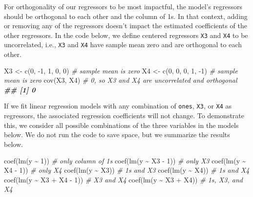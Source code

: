 \documentclass[
]{book}
\newenvironment{Shaded}{\begin{snugshade}}{\end{snugshade}}
\newcommand{\CommentTok}[1]{\textcolor[rgb]{0.56,0.35,0.01}{\textit{#1}}}
\newcommand{\DecValTok}[1]{\textcolor[rgb]{0.00,0.00,0.81}{#1}}
\newcommand{\DocumentationTok}[1]{\textcolor[rgb]{0.56,0.35,0.01}{\textbf{\textit{#1}}}}
\newcommand{\FunctionTok}[1]{\textcolor[rgb]{0.00,0.00,0.00}{#1}}
\newcommand{\NormalTok}[1]{#1}
\newcommand{\OtherTok}[1]{\textcolor[rgb]{0.56,0.35,0.01}{#1}}
\newcommand{\SpecialCharTok}[1]{\textcolor[rgb]{0.00,0.00,0.00}{#1}}
\theoremstyle{definition}
\theoremstyle{definition}
\theoremstyle{definition}
\theoremstyle{definition}
\theoremstyle{remark}
\begin{document}
For orthogonality of our regressors to be most impactful, the model's
regressors should be orthogonal to each other and the column of 1s. In
that context, adding or removing any of the regressors doesn't impact
the estimated coefficients of the other regressors. In the code below,
we define centered regressors \texttt{X3} and \texttt{X4} to be uncorrelated, i.e.,
\texttt{X3} and \texttt{X4} have sample mean zero and are orthogonal to each other.

\begin{Shaded}
\begin{Highlighting}[]
\NormalTok{X3 }\OtherTok{\textless{}{-}}  \FunctionTok{c}\NormalTok{(}\DecValTok{0}\NormalTok{, }\SpecialCharTok{{-}}\DecValTok{1}\NormalTok{, }\DecValTok{1}\NormalTok{, }\DecValTok{0}\NormalTok{, }\DecValTok{0}\NormalTok{) }\CommentTok{\# sample mean is zero}
\NormalTok{X4 }\OtherTok{\textless{}{-}} \FunctionTok{c}\NormalTok{(}\DecValTok{0}\NormalTok{, }\DecValTok{0}\NormalTok{, }\DecValTok{0}\NormalTok{, }\DecValTok{1}\NormalTok{, }\SpecialCharTok{{-}}\DecValTok{1}\NormalTok{)  }\CommentTok{\# sample mean is zero}
\FunctionTok{cov}\NormalTok{(X3, X4)              }\CommentTok{\# 0, so X3 and X4 are uncorrelated and orthogonal}
\DocumentationTok{\#\# [1] 0}
\end{Highlighting}
\end{Shaded}

If we fit linear regression models with any combination of \texttt{ones}, \texttt{X3},
or \texttt{X4} as regressors, the associated regression coefficients will not
change. To demonstrate this, we consider all possible combinations of
the three variables in the models below. We do not run the code to save
space, but we summarize the results below.

\begin{Shaded}
\begin{Highlighting}[]
\FunctionTok{coef}\NormalTok{(}\FunctionTok{lm}\NormalTok{(y }\SpecialCharTok{\textasciitilde{}} \DecValTok{1}\NormalTok{))           }\CommentTok{\# only column of 1s}
\FunctionTok{coef}\NormalTok{(}\FunctionTok{lm}\NormalTok{(y }\SpecialCharTok{\textasciitilde{}}\NormalTok{ X3 }\SpecialCharTok{{-}} \DecValTok{1}\NormalTok{))      }\CommentTok{\# only X3}
\FunctionTok{coef}\NormalTok{(}\FunctionTok{lm}\NormalTok{(y }\SpecialCharTok{\textasciitilde{}}\NormalTok{ X4 }\SpecialCharTok{{-}} \DecValTok{1}\NormalTok{))      }\CommentTok{\# only X4}
\FunctionTok{coef}\NormalTok{(}\FunctionTok{lm}\NormalTok{(y }\SpecialCharTok{\textasciitilde{}}\NormalTok{ X3))          }\CommentTok{\# 1s and X3}
\FunctionTok{coef}\NormalTok{(}\FunctionTok{lm}\NormalTok{(y }\SpecialCharTok{\textasciitilde{}}\NormalTok{ X4))          }\CommentTok{\# 1s and X4}
\FunctionTok{coef}\NormalTok{(}\FunctionTok{lm}\NormalTok{(y }\SpecialCharTok{\textasciitilde{}}\NormalTok{ X3 }\SpecialCharTok{+}\NormalTok{ X4 }\SpecialCharTok{{-}} \DecValTok{1}\NormalTok{)) }\CommentTok{\# X3 and X4}
\FunctionTok{coef}\NormalTok{(}\FunctionTok{lm}\NormalTok{(y }\SpecialCharTok{\textasciitilde{}}\NormalTok{ X3 }\SpecialCharTok{+}\NormalTok{ X4))     }\CommentTok{\# 1s, X3, and X4}
\end{Highlighting}
\end{Shaded}
\end{document}
